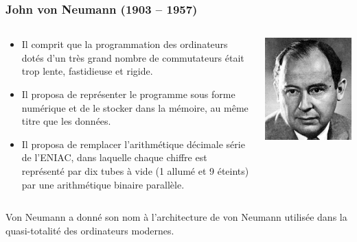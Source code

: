 \documentclass[utf8,10pt]{beamer}
\begin{document}
\begin{frame}
    \frametitle{John von Neumann (1903 -- 1957)} 
    
    \begin{columns}
    \begin{column}{0.6\textwidth}
     \begin{itemize}
        \item Il comprit que la programmation des ordinateurs dotés d'un très grand nombre de commutateurs
         était trop
        lente, fastidieuse et rigide.
        \item Il proposa de représenter le programme sous forme numérique et de le stocker dans la
        mémoire, au même titre que les données.
        \item Il proposa de remplacer l'\alert{arithmétique décimale} série de l'ENIAC, dans laquelle chaque chiffre 
        est représenté par dix tubes à vide (1 allumé et 9 éteints) par une \alert{arithmétique binaire parallèle}.        
     \end{itemize}
    \end{column}
    \begin{column}{0.4\textwidth}
            \includegraphics[scale=0.28]{./images/JohnvonNeumann-LosAlamos}
    \end{column}
    \end{columns}
    \begin{block}{}
        Von Neumann a donné son nom à l'\alert{architecture de von Neumann} utilisée dans la quasi-totalité des ordinateurs modernes.
    \end{block}
    
    \hfill \hyperlink{http://fr.wikipedia.org/wiki/Alan_Turing}{}

\end{frame}
\end{document}
